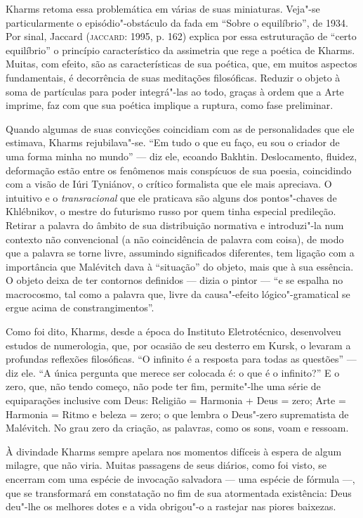 Kharms retoma essa problemática em várias de suas miniaturas. Veja"-se
particularmente o episódio"-obstáculo da fada em ``Sobre o equilíbrio'',
de 1934. Por sinal, Jaccard (\textsc{jaccard}: 1995, p. 162) explica por
essa estruturação de ``certo equilíbrio'' o princípio característico da
assimetria que rege a poética de Kharms. Muitas, com efeito, são as
características de sua poética, que, em muitos aspectos fundamentais, é
decorrência de suas meditações filosóficas. Reduzir o objeto à soma de
partículas para poder integrá"-las ao todo, graças à ordem que a Arte
imprime, faz com que sua poética implique a ruptura, como fase
preliminar.

Quando algumas de suas convicções coincidiam com as de personalidades
que ele estimava, Kharms rejubilava"-se. ``Em tudo o que eu faço, eu sou
o criador de uma forma minha no mundo'' --- diz ele, ecoando Bakhtin.
Deslocamento, fluidez, deformação estão entre os fenômenos mais
conspícuos de sua poesia, coincidindo com a visão de Iúri Tyniánov, o
crítico formalista que ele mais apreciava. O intuitivo e o
\emph{transracional} que ele praticava são alguns dos pontos"-chaves de
Khlébnikov, o mestre do futurismo russo por quem tinha especial
predileção. Retirar a palavra do âmbito de sua distribuição normativa e
introduzi"-la num contexto não convencional (a não coincidência de
palavra com coisa), de modo que a palavra se torne livre, assumindo
significados diferentes, tem ligação com a importância que Malévitch
dava à ``situação'' do objeto, mais que à sua essência. O objeto deixa
de ter contornos definidos --- dizia o pintor --- ``e se espalha no
macrocosmo, tal como a palavra que, livre da causa"-efeito
lógico"-gramatical se ergue acima de constrangimentos''.

Como foi dito, Kharms, desde a época do Instituto Eletrotécnico,
desenvolveu estudos de numerologia, que, por ocasião de seu desterro em
Kursk, o levaram a profundas reflexões filosóficas. ``O infinito é a
resposta para todas as questões'' --- diz ele. ``A única pergunta que
merece ser colocada é: o que é o infinito?'' E o zero, que, não tendo
começo, não pode ter fim, permite"-lhe uma série de equiparações
inclusive com Deus: Religião = Harmonia + Deus = zero; Arte = Harmonia =
Ritmo e beleza = zero; o que lembra o Deus"-zero suprematista de
Malévitch. No grau zero da criação, as palavras, como os sons, voam e
ressoam.

À divindade Kharms sempre apelara nos momentos difíceis à espera de
algum milagre, que não viria. Muitas passagens de seus diários, como foi
visto, se encerram com uma espécie de invocação salvadora --- uma espécie
de fórmula ---, que se transformará em constatação no fim de sua
atormentada existência: Deus deu"-lhe os melhores dotes e a vida
obrigou"-o a rastejar nas piores baixezas.


